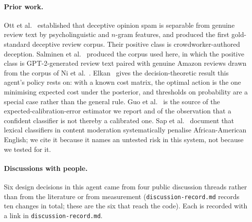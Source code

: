\documentclass{article}
\begin{document}
\paragraph{Prior work.}
Ott et al.~ established that deceptive opinion spam
is separable from genuine review text by psycholinguistic and $n$-gram
features, and produced the first gold-standard deceptive review corpus. Their
positive class is crowdworker-authored deception. Salminen et
al.~ produced the corpus used here, in which
the positive class is GPT-2-generated review text paired with genuine Amazon
reviews drawn from the corpus of Ni et
al.~. Elkan~ gives
the decision-theoretic result this agent's policy rests on: with a known cost
matrix, the optimal action is the one minimising expected cost under the
posterior, and thresholds on probability are a special case rather than the
general rule. Guo et al.~ is the source of the
expected-calibration-error estimator we report and of the observation that a
confident classifier is not thereby a calibrated one. Sap et
al.~ document that lexical classifiers in content
moderation systematically penalise African-American English; we cite it because
it names an untested risk in this system, not because we tested for it.

\paragraph{Discussions with people.}
Six design decisions in this agent came from four public discussion threads
rather than from the literature or from measurement (\texttt{discussion-record.md}
records ten changes in total; these are the six that reach the code). Each is recorded with a link in
\texttt{discussion-record.md}.
\end{document}
